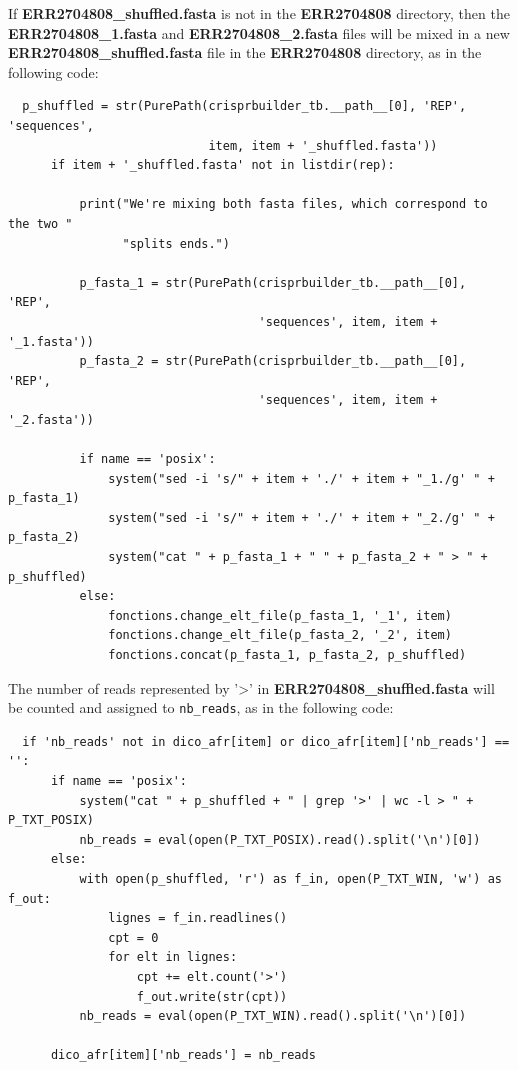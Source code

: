 \documentclass[twoside,a4paper,11pt,frenchb,openany]{report}
\begin{document}
    If \textbf{ERR2704808\_shuffled.fasta} is not in the \textbf{ERR2704808}
directory, then the\\ \textbf{ERR2704808\_1.fasta} and \textbf{ERR2704808\_2.fasta} files
will be mixed in a new\\ \textbf{ERR2704808\_shuffled.fasta} file in the
\textbf{ERR2704808} directory, as in the following code:

\begin{verbatim}
  p_shuffled = str(PurePath(crisprbuilder_tb.__path__[0], 'REP', 'sequences',
                            item, item + '_shuffled.fasta'))
      if item + '_shuffled.fasta' not in listdir(rep):

          print("We're mixing both fasta files, which correspond to the two "
                "splits ends.")

          p_fasta_1 = str(PurePath(crisprbuilder_tb.__path__[0], 'REP',
                                   'sequences', item, item + '_1.fasta'))
          p_fasta_2 = str(PurePath(crisprbuilder_tb.__path__[0], 'REP',
                                   'sequences', item, item + '_2.fasta'))

          if name == 'posix':
              system("sed -i 's/" + item + './' + item + "_1./g' " + p_fasta_1)
              system("sed -i 's/" + item + './' + item + "_2./g' " + p_fasta_2)
              system("cat " + p_fasta_1 + " " + p_fasta_2 + " > " + p_shuffled)
          else:
              fonctions.change_elt_file(p_fasta_1, '_1', item)
              fonctions.change_elt_file(p_fasta_2, '_2', item)
              fonctions.concat(p_fasta_1, p_fasta_2, p_shuffled)
\end{verbatim}

    The number of reads represented by '\textgreater{}' in
\textbf{ERR2704808\_shuffled.fasta} will be counted and assigned to \texttt{nb\_reads}, as
in the following code:

\begin{verbatim}
  if 'nb_reads' not in dico_afr[item] or dico_afr[item]['nb_reads'] == '':
      if name == 'posix':
          system("cat " + p_shuffled + " | grep '>' | wc -l > " + P_TXT_POSIX)
          nb_reads = eval(open(P_TXT_POSIX).read().split('\n')[0])
      else:
          with open(p_shuffled, 'r') as f_in, open(P_TXT_WIN, 'w') as f_out:
              lignes = f_in.readlines()
              cpt = 0
              for elt in lignes:
                  cpt += elt.count('>')
                  f_out.write(str(cpt))
          nb_reads = eval(open(P_TXT_WIN).read().split('\n')[0])

      dico_afr[item]['nb_reads'] = nb_reads
\end{verbatim}
\end{document}
